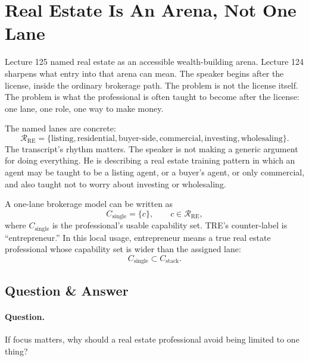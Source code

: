 \documentclass[11pt,oneside]{book}
\begin{document}

\section{Real Estate Is An Arena, Not One Lane}

Lecture 125 named real estate as an accessible wealth-building arena. Lecture 124 sharpens what entry into that arena can mean. The speaker begins after the license, inside the ordinary brokerage path. The problem is not the license itself. The problem is what the professional is often taught to become after the license: one lane, one role, one way to make money.

The named lanes are concrete:
\[
\mathcal{R}_{\mathrm{RE}}
=
\{
\text{listing},
\text{residential},
\text{buyer-side},
\text{commercial},
\text{investing},
\text{wholesaling}
\}.
\]
The transcript's rhythm matters. The speaker is not making a generic argument for doing everything. He is describing a real estate training pattern in which an agent may be taught to be a listing agent, or a buyer's agent, or only commercial, and also taught not to worry about investing or wholesaling.

A one-lane brokerage model can be written as
\[
C_{\text{single}}=\{c\},
\qquad
c\in\mathcal{R}_{\mathrm{RE}},
\]
where \(C_{\text{single}}\) is the professional's usable capability set. TRE's counter-label is ``entrepreneur.'' In this local usage, entrepreneur means a true real estate professional whose capability set is wider than the assigned lane:
\[
C_{\text{single}}\subset C_{\text{stack}}.
\]

\subsection{Question \& Answer}

\paragraph{Question.}
If focus matters, why should a real estate professional avoid being limited to one thing?
\end{document}
